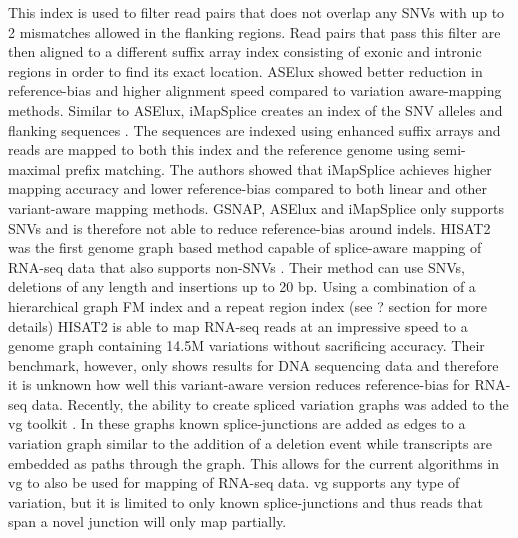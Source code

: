 This index is used to filter read pairs that does not overlap any SNVs with up to 2 mismatches allowed in the flanking regions. 
Read pairs that pass this filter are then aligned to a different suffix array index consisting of exonic and intronic regions in order to find its exact location. 
ASElux showed better reduction in reference-bias and higher alignment speed compared to variation aware-mapping methods.
Similar to ASElux, iMapSplice creates an index of the SNV alleles and flanking sequences \cite{Liu_2018}.
The sequences are indexed using enhanced suffix arrays and reads are mapped to both this index and the reference genome using semi-maximal prefix matching.
The authors showed that iMapSplice achieves higher mapping accuracy and lower reference-bias compared to both linear and other variant-aware mapping methods.
GSNAP, ASElux and iMapSplice only supports SNVs and is therefore not able to reduce reference-bias around indels.
HISAT2 was the first genome graph based method capable of splice-aware mapping of RNA-seq data that also supports non-SNVs \cite{Kim_2019}. 
Their method can use SNVs, deletions of any length and insertions up to 20 bp.
Using a combination of a hierarchical graph FM index and a repeat region index (see ? section for more details) HISAT2 is able to map RNA-seq reads at an impressive speed to a genome graph containing 14.5M variations without sacrificing accuracy. 
Their benchmark, however, only shows results for DNA sequencing data and therefore it is unknown how well this variant-aware version reduces reference-bias for RNA-seq data.
Recently, the ability to create spliced variation graphs was added to the vg toolkit \cite{Garrison_2018}. 
In these graphs known splice-junctions are added as edges to a variation graph similar to the addition of a deletion event while transcripts are embedded as paths through the graph. 
This allows for the current algorithms in vg to also be used for mapping of RNA-seq data. 
vg supports any type of variation, but it is limited to only known splice-junctions and thus reads that span a novel junction will only map partially. \\

